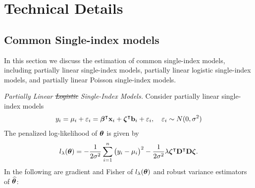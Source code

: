 \section{Technical Details}
\subsection{Common Single-index models}
In this section we discuss the estimation of common single-index models, including partially linear single-index models, partially linear logistic single-index models, and partially linear Poisson single-index models. 

\emph{Partially Linear \sout{Logistic} Single-Index Models.}
Consider partially linear single-index models
\begin{equation}
	y_i =\mu_i+\varepsilon_i =  \bm\beta^\intercal\mathbf{x}_i+\bm\zeta^\intercal\mathbf{b}_i+\varepsilon_i,~~~\varepsilon_i\sim N(0,\sigma^2)\label{linear}
\end{equation}
The penalized log-likelihood of $\bm\theta$ is given by
\begin{equation*}
	l_\lambda(\bm\theta) = -\frac{1}{2\sigma^2}\sum_{i=1}^n \big(y_i-\mu_i\big)^2 - \frac{1}{2\sigma^2}\lambda\bm\zeta^\intercal\mathbf{D}^\intercal\mathbf{D}\bm\zeta.
\end{equation*}	
In the following are gradient and Fisher of $l_\lambda(\bm\theta)$ and robust variance estimators of $\widehat{\bm\theta}$:
\vspace{-0.35cm}
